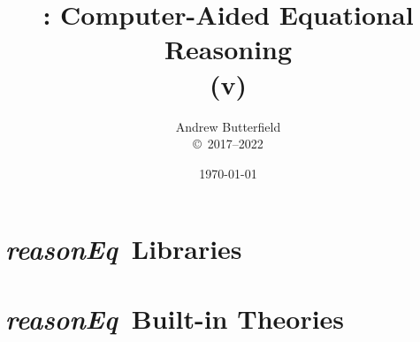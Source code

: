 \documentclass[fleqn,10pt]{report}
\author{
Andrew Butterfield
\\
{\small \copyright\ 2017--2022}
}
\title{
  \reasonEq: Computer-Aided Equational Reasoning
  \\(v\reqVersion)
}
\date{
\today
}
\def\reasonEq{\textit{\textsf{reasonEq}}}
\begin{document}
\maketitle
\tableofcontents

% 


\chapter{\reasonEq\ Libraries}


\newpage
\newpage
\newpage
\newpage
\newpage

\chapter{\reasonEq\ Built-in Theories}
%
%
%
%
%

\newpage
\end{document}

